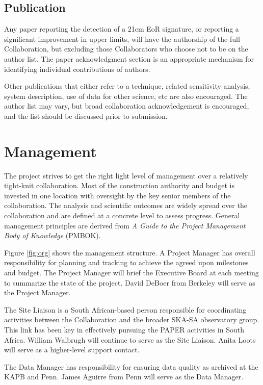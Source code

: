 \documentclass[preprint]{aastex}
\begin{document}
\subsection{Publication}
\label{sec:publication}
Any paper reporting the detection of a 21cm EoR signature, or reporting a significant
improvement in upper limits, will have the authorship of the full Collaboration, but
excluding those Collaborators who choose not to be on the author list. The paper
acknowledgment section is an appropriate mechanism for identifying individual
contributions of authors.

Other publications that either refer to a technique, related sensitivity analysis, system
description, use of data for other science, etc are also encouraged.  The author list
may vary, but broad collaboration acknowledgement is encouraged, and the list should
be discussed prior to submission.

\section{Management}
The project strives to get the right light level of management over a relatively tight-knit
collaboration.  Most of the construction authority and budget is invested in one location
with oversight by the key senior members of the collaboration.  The analysis and 
scientific outcomes are widely spread over the collaboration and are defined at a 
concrete level to assess progress.  General management principles are derived from
{\it A Guide to the Project Management Body of Knowledge} (PMBOK).

Figure \ref{fig:org} shows the management structure.   A Project Manager has
overall responsibility for planning and tracking to achieve the agreed upon
milestones and budget. The Project Manager will brief the Executive Board at each
meeting to summarize the state of the project.  David DeBoer from Berkeley will serve
as the Project Manager.

The Site Liaison is a South African-based person responsible for coordinating activities
between the Collaboration and the broader SKA-SA observatory group.  This link has 
been key in effectively pursuing the PAPER activities in South Africa.  William Walbrugh
will continue to serve as the Site Liaison.  Anita Loots will serve as a higher-level
support contact.

The Data Manager has responsibility for ensuring data quality as archived at the KAPB and 
Penn.  James Aguirre from Penn will serve as the Data Manager.
\end{document}
